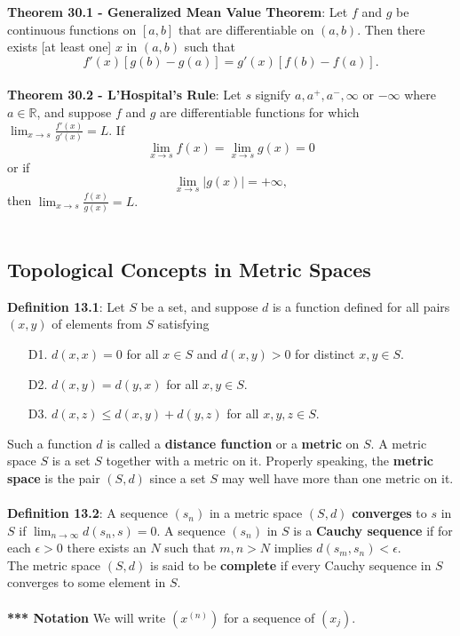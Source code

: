 \documentclass{article}
\theoremstyle{definition}
\begin{document}
\textbf{Theorem 30.1 - Generalized Mean Value Theorem}: Let $f$ and $g$ be continuous functions on $[a, b]$ that are differentiable
on $(a, b)$. Then there exists [at least one] $x$ in $(a, b)$ such that $$f'(x)[g(b) - g(a)] = g'(x)[f(b) - f(a)].$$ \\
\textbf{Theorem 30.2 - L’Hospital’s Rule}: Let $s$ signify $a, a^+, a^-, \infty$ or $-\infty$ where $a \in \mathbb{R}$, and suppose $f$ and $g$ are differentiable functions for which $\lim_{x \rightarrow s} \frac{f'(x)}{g'(x)} = L$. If $$\lim_{x \rightarrow s} f(x) = \lim_{x \rightarrow s} g(x) = 0$$ or if $$\lim_{x \rightarrow s} |g(x)| = +\infty,$$ then $\lim_{x \rightarrow s} \frac{f(x)}{g(x)} = L.$ \\ \\
\subsection*{Topological Concepts in Metric Spaces}
\textbf{Definition 13.1}: Let $S$ be a set, and suppose $d$ is a function defined for all pairs $(x, y)$ of elements from $S$ satisfying \begin{enumerate}
    \item[D1.] $d(x, x) = 0$ for all $x \in S$ and $d(x, y) > 0$ for distinct $x, y \in S$.
    \item[D2.] $d(x, y) = d(y, x)$ for all $x, y \in S$.
    \item[D3.] $d(x, z) \leq d(x, y) + d(y, z)$ for all $x, y, z \in S$.
\end{enumerate}
Such a function $d$ is called a \textbf{distance function} or a \textbf{metric} on $S$. A metric space $S$ is a set $S$ together with a metric on it. Properly speaking, the \textbf{metric space} is the pair $(S, d)$ since a set $S$ may well have more than one metric on it. \\ \\
\textbf{Definition 13.2}: A sequence $(s_n)$ in a metric space $(S, d)$ \textbf{converges} to $s$ in $S$ if $\lim_{n \rightarrow \infty} d(s_n, s) = 0$. A sequence $(s_n)$ in $S$ is a \textbf{Cauchy sequence} if for each $\epsilon > 0$ there exists an $N$ such that $m, n > N$ implies $d(s_m, s_n) < \epsilon$. \\ 
The metric space $(S, d)$ is said to be \textbf{complete} if every Cauchy sequence in $S$ converges to some element in $S$. \\ \\
\textbf{*** Notation} We will write $(x^{(n)})$ for a sequence of $(x_j)$. \\ \\
\end{document}
